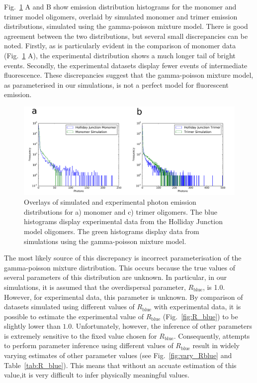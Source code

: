 Fig.~\ref{fig:HJ_sim_overlay} A and B show emission distribution histograms for the monomer and trimer model oligomers, overlaid by simulated monomer and trimer emission distributions, simulated using the gamma-poisson mixture model. There is good agreement between the two distributions, but several small discrepancies can be noted. Firstly, as is particularly evident in the comparison of monomer data (Fig.~\ref{fig:HJ_sim_overlay} A), the experimental distribution shows a much longer tail of bright events. Secondly, the experimental datasets display fewer events of intermediate fluorescence. These discrepancies suggest that the gamma-poisson mixture model, as parameterised in our simulations, is not a perfect model for fluorescent emission.

\begin{figure}
   \begin{center}
      \includegraphics*[clip=true, width=6in]{sizing/HJ_overlays.pdf}
      \caption{Overlays of simulated and experimental photon emission distributions for a) monomer and c) trimer oligomers. The blue histograms display experimental data from the Holliday Junction model oligomers. The green histograms display data from simulations using the gamma-poisson mixture model.}
      \label{fig:HJ_sim_overlay}
   \end{center}
\end{figure}

The most likely source of this discrepancy is incorrect parameterisation of the gamma-poisson mixture distribution. This occurs because the true values of several parameters of this distribution are unknown. In particular, in our simulations, it is assumed that the overdispersal parameter, $R_{\text{blue}}$, is 1.0. However, for experimental data, this parameter is unknown. By comparison of datasets simulated using different values of $R_{\text{blue}}$ with experimental data, it is possible to estimate the experimental value of $R_{\text{blue}}$ (Fig.~\ref{fig:R_blue}) to be slightly lower than $1.0$. Unfortunately, however, the inference of other parameters is extremely sensitive to the fixed value chosen for $R_{\text{blue}}$. Consequently, attempts to perform parameter inference using different values of $R_{\text{blue}}$ result in widely varying estimates of other parameter values (see Fig.~\ref{fig:vary_Rblue} and Table~\ref{tab:R_blue}). This means that without an accuate estimation of this value,it is very difficult to infer physically meaningful values.

